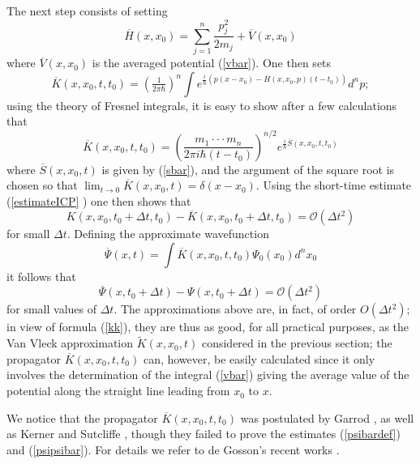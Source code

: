 \documentclass[12pt]{article}%
\begin{document}
The next step consists of setting
\begin{equation}
\overline{H}(x,x_{0})=\sum_{j=1}^{n}\frac{p_{j}^{2}}{2m_{j}}+\overline
{V}(x,x_{0}) \label{hbar}%
\end{equation}
where $\overline{V}(x,x_{0})$ is the averaged potential (\ref{vbar}). One then
sets%
\begin{equation}
\overline{K}(x,x_{0},t,t_{0})=\left(  \tfrac{1}{2\pi\hbar}\right)  ^{n}\int
e^{\tfrac{i}{\hbar}(p(x-x_{0})-\overline{H}(x,x_{0},p)(t-t_{0}))}d^{n}p;
\label{KSpropagator}%
\end{equation}
using the theory of Fresnel integrals, it is easy to show after a few
calculations that%
\begin{equation}
\overline{K}(x,x_{0},t,t_{0})=\left(  \frac{m_{1}\cdot\cdot\cdot m_{n}}{2\pi
i\hbar(t-t_{0})}\right)  ^{n/2}e^{\frac{i}{\hbar}\overline{S}(x,x_{0}%
,t,t_{0})} \label{kbarfree}%
\end{equation}
where $\overline{S}(x,x_{0},t)$ is given by (\ref{sbar}), and the argument of
the square root is chosen so that $\lim_{t\rightarrow0}\overline{K}%
(x,x_{0},t)=\delta(x-x_{0})$. Using the short-time estimate (\ref{estimateICP}%
) one then shows that%
\begin{equation}
K(x,x_{0},t_{0}+\Delta t,t_{0})-\overline{K}(x,x_{0},t_{0}+\Delta
t,t_{0})=\mathcal{O}(\Delta t^{2}) \label{essentiel}%
\end{equation}
for small $\Delta t$. Defining the approximate wavefunction%
\begin{equation}
\overline{\Psi}(x,t)=\int\overline{K}(x,x_{0},t,t_{0})\Psi_{0}(x_{0}%
)d^{n}x_{0} \label{psibardef}%
\end{equation}
it follows that
\begin{equation}
\overline{\Psi}(x,t_{0}+\Delta t)-\Psi(x,t_{0}+\Delta t)=\mathcal{O}(\Delta
t^{2}) \label{psipsibar}%
\end{equation}
for small values of $\Delta t$. The approximations above are, in fact, of
order $O(\Delta t^{2})$; in view of formula (\ref{kk}), they are thus as good,
for all practical purposes, as the Van Vleck approximation $\widetilde
{K}(x,x_{0},t)$ considered in the previous section; the propagator
$\overline{K}(x,x_{0},t,t_{0})$ can, however, be easily calculated since it
only involves the determination of the integral (\ref{vbar}) giving the
average value of the potential along the straight line leading from $x_{0}$ to
$x$.

We notice that the propagator $\overline{K}(x,x_{0},t,t_{0})$ was postulated
by Garrod \cite{Garrod}, as well as Kerner and Sutcliffe \cite{Kerner}, though
they failed to prove the estimates (\ref{psibardef}) and (\ref{psipsibar}).
For details we refer to de Gosson's recent works \cite{go16-1,go16-2}.
\end{document}

